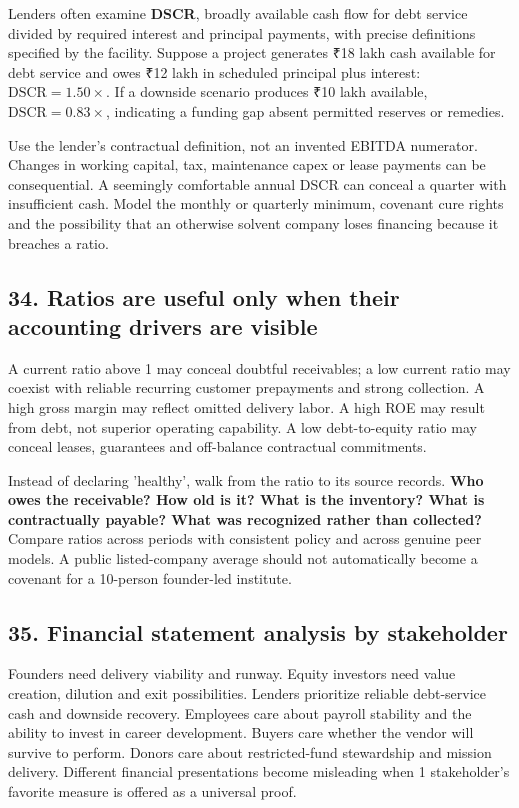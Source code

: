 Lenders often examine \textbf{DSCR}, broadly available cash flow for debt service divided by required interest and principal payments, with precise definitions specified by the facility. Suppose a project generates ₹18 lakh cash available for debt service and owes ₹12 lakh in scheduled principal plus interest: $\mathrm{DSCR} = \mathbf{1.50\times}$. If a downside scenario produces ₹10 lakh available, $\mathrm{DSCR} = \mathbf{0.83\times}$, indicating a funding gap absent permitted reserves or remedies.

Use the lender's contractual definition, not an invented EBITDA numerator. Changes in working capital, tax, maintenance capex or lease payments can be consequential. A seemingly comfortable annual DSCR can conceal a quarter with insufficient cash. Model the monthly or quarterly minimum, covenant cure rights and the possibility that an otherwise solvent company loses financing because it breaches a ratio.

\subsection{34. Ratios are useful only when their accounting drivers are visible}


A current ratio above 1 may conceal doubtful receivables; a low current ratio may coexist with reliable recurring customer prepayments and strong collection. A high gross margin may reflect omitted delivery labor. A high ROE may result from debt, not superior operating capability. A low debt-to-equity ratio may conceal leases, guarantees and off-balance contractual commitments.

Instead of declaring 'healthy', walk from the ratio to its source records. \textbf{Who owes the receivable? How old is it? What is the inventory? What is contractually payable? What was recognized rather than collected?} Compare ratios across periods with consistent policy and across genuine peer models. A public listed-company average should not automatically become a covenant for a 10-person founder-led institute.

\subsection{35. Financial statement analysis by stakeholder}


Founders need delivery viability and runway. Equity investors need value creation, dilution and exit possibilities. Lenders prioritize reliable debt-service cash and downside recovery. Employees care about payroll stability and the ability to invest in career development. Buyers care whether the vendor will survive to perform. Donors care about restricted-fund stewardship and mission delivery. Different financial presentations become misleading when 1 stakeholder's favorite measure is offered as a universal proof.

